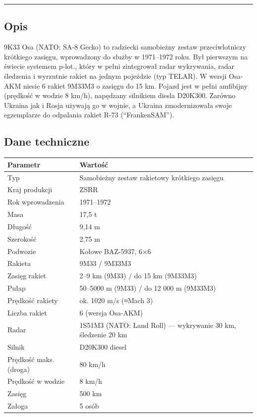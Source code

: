 \documentclass[12pt,oneside]{book}
\begin{document}
\begin{center}\rule{0.5\linewidth}{0.5pt}\end{center}

\subsection{Opis}\label{opis-41}

9K33 Osa (NATO: SA-8 Gecko) to radziecki samobieżny zestaw
przeciwlotniczy krótkiego zasięgu, wprowadzony do służby w 1971--1972
roku. Był pierwszym na świecie systemem p-lot., który w pełni
zintegrował radar wykrywania, radar śledzenia i wyrzutnie rakiet na
jednym pojeździe (typ TELAR). W wersji Osa-AKM niesie 6 rakiet 9M33M3 o
zasięgu do 15 km. Pojazd jest w pełni amfibijny (prędkość w wodzie 8
km/h), napędzany silnikiem diesla D20K300. Zarówno Ukraina jak i Rosja
używają go w wojnie, a Ukraina zmodernizowała swoje egzemplarze do
odpalania rakiet R-73 (``FrankenSAM'').

\subsection{Dane techniczne}\label{dane-techniczne-41}

\begin{longtable}[]{@{}ll@{}}
\toprule\noalign{}
Parametr & Wartość \\
\midrule\noalign{}
\endhead
\bottomrule\noalign{}
\endlastfoot
Typ & Samobieżny zestaw rakietowy krótkiego zasięgu \\
Kraj produkcji & ZSRR \\
Rok wprowadzenia & 1971--1972 \\
Masa & 17,5 t \\
Długość & 9,14 m \\
Szerokość & 2,75 m \\
Podwozie & Kołowe BAZ-5937, 6×6 \\
Rakieta & 9M33 / 9M33M3 \\
Zasięg rakiet & 2--9 km (9M33) / do 15 km (9M33M3) \\
Pułap & 50--5000 m (9M33) / do 12 000 m (9M33M3) \\
Prędkość rakiety & ok. 1020 m/s (≈Mach 3) \\
Liczba rakiet & 6 (wersja Osa-AKM) \\
Radar & 1S51M3 (NATO: Land Roll) --- wykrywanie 30 km, śledzenie 20
km \\
Silnik & D20K300 diesel \\
Prędkość maks. (droga) & 80 km/h \\
Prędkość w wodzie & 8 km/h \\
Zasięg & 500 km \\
Załoga & 5 osób \\
\end{longtable}
\end{document}
